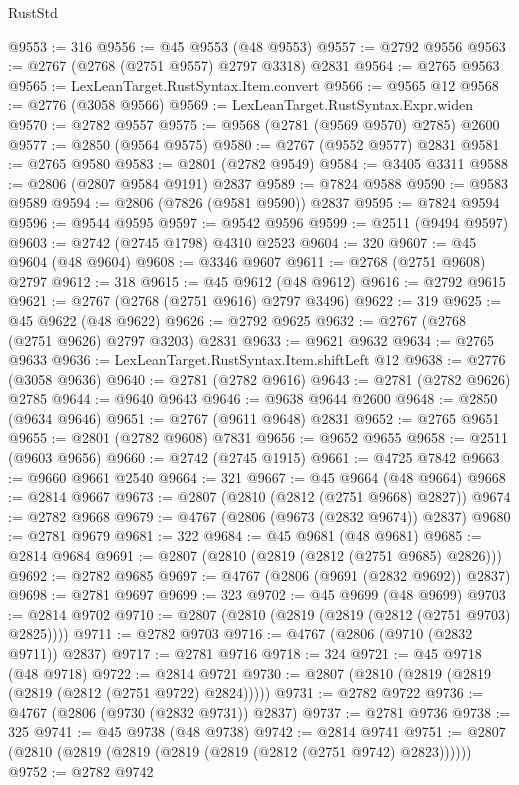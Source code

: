 \begin{lexlean}{RustStd}
\begin{coremodule}
@9553 := 316
@9556 := @45 @9553 (@48 @9553)
@9557 := @2792 @9556
@9563 := @2767 (@2768 (@2751 @9557) @2797 @3318) @2831
@9564 := @2765 @9563
@9565 := LexLeanTarget.RustSyntax.Item.convert
@9566 := @9565 @12
@9568 := @2776 (@3058 @9566)
@9569 := LexLeanTarget.RustSyntax.Expr.widen
@9570 := @2782 @9557
@9575 := @9568 (@2781 (@9569 @9570) @2785) @2600
@9577 := @2850 (@9564 @9575)
@9580 := @2767 (@9552 @9577) @2831
@9581 := @2765 @9580
@9583 := @2801 (@2782 @9549)
@9584 := @3405 @3311
@9588 := @2806 (@2807 @9584 @9191) @2837
@9589 := @7824 @9588
@9590 := @9583 @9589
@9594 := @2806 (@7826 (@9581 @9590)) @2837
@9595 := @7824 @9594
@9596 := @9544 @9595
@9597 := @9542 @9596
@9599 := @2511 (@9494 @9597)
@9603 := @2742 (@2745 @1798) @4310 @2523
@9604 := 320
@9607 := @45 @9604 (@48 @9604)
@9608 := @3346 @9607
@9611 := @2768 (@2751 @9608) @2797
@9612 := 318
@9615 := @45 @9612 (@48 @9612)
@9616 := @2792 @9615
@9621 := @2767 (@2768 (@2751 @9616) @2797 @3496)
@9622 := 319
@9625 := @45 @9622 (@48 @9622)
@9626 := @2792 @9625
@9632 := @2767 (@2768 (@2751 @9626) @2797 @3203) @2831
@9633 := @9621 @9632
@9634 := @2765 @9633
@9636 := LexLeanTarget.RustSyntax.Item.shiftLeft @12
@9638 := @2776 (@3058 @9636)
@9640 := @2781 (@2782 @9616)
@9643 := @2781 (@2782 @9626) @2785
@9644 := @9640 @9643
@9646 := @9638 @9644 @2600
@9648 := @2850 (@9634 @9646)
@9651 := @2767 (@9611 @9648) @2831
@9652 := @2765 @9651
@9655 := @2801 (@2782 @9608) @7831
@9656 := @9652 @9655
@9658 := @2511 (@9603 @9656)
@9660 := @2742 (@2745 @1915)
@9661 := @4725 @7842
@9663 := @9660 @9661 @2540
@9664 := 321
@9667 := @45 @9664 (@48 @9664)
@9668 := @2814 @9667
@9673 := @2807 (@2810 (@2812 (@2751 @9668) @2827))
@9674 := @2782 @9668
@9679 := @4767 (@2806 (@9673 (@2832 @9674)) @2837)
@9680 := @2781 @9679
@9681 := 322
@9684 := @45 @9681 (@48 @9681)
@9685 := @2814 @9684
@9691 := @2807 (@2810 (@2819 (@2812 (@2751 @9685) @2826)))
@9692 := @2782 @9685
@9697 := @4767 (@2806 (@9691 (@2832 @9692)) @2837)
@9698 := @2781 @9697
@9699 := 323
@9702 := @45 @9699 (@48 @9699)
@9703 := @2814 @9702
@9710 := @2807 (@2810 (@2819 (@2819 (@2812 (@2751 @9703) @2825))))
@9711 := @2782 @9703
@9716 := @4767 (@2806 (@9710 (@2832 @9711)) @2837)
@9717 := @2781 @9716
@9718 := 324
@9721 := @45 @9718 (@48 @9718)
@9722 := @2814 @9721
@9730 := @2807 (@2810 (@2819 (@2819 (@2819 (@2812 (@2751 @9722) @2824)))))
@9731 := @2782 @9722
@9736 := @4767 (@2806 (@9730 (@2832 @9731)) @2837)
@9737 := @2781 @9736
@9738 := 325
@9741 := @45 @9738 (@48 @9738)
@9742 := @2814 @9741
@9751 := @2807 (@2810 (@2819 (@2819 (@2819 (@2819 (@2812 (@2751 @9742) @2823))))))
@9752 := @2782 @9742

\end{coremodule}
\end{lexlean}

